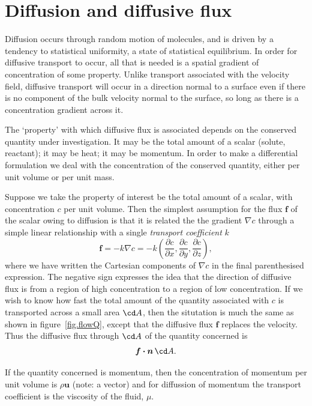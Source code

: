 \documentclass[a4paper,11pt]		{report}
\begin{document}
\section{Diffusion and diffusive flux}

Diffusion occurs through random motion of molecules, and is driven by
a tendency to statistical uniformity, \ie a state of statistical
equilibrium. In order for diffusive transport to occur, all that is
needed is a spatial gradient of concentration of some property. Unlike
transport associated with the velocity field, diffusive transport will
occur in a direction normal to a surface even if there is no component
of the bulk velocity normal to the surface, so long as there is a
concentration gradient across it.

The `property' with which diffusive flux is associated depends on the
conserved quantity under investigation. It may be the total amount of
a scalar (\eg solute, reactant); it may be heat; it may be momentum.
In order to make a differential formulation we deal with the
concentration of the conserved quantity, either per unit volume or per
unit mass.

Suppose we take the property of interest be the total amount of a
scalar, with concentration $c$ per unit volume. Then the simplest
assumption for the flux $\bm{f}$ of the scalar owing to diffusion is
that it is related the the gradient $\nabla c$ through a simple linear
relationship with a single \emph{transport coefficient} $k$
\[
\bm{f}=-k\nabla c = -k \left(
 \frac{\partial c}{\partial x},
 \frac{\partial c}{\partial y},
 \frac{\partial c}{\partial z}
\right),
\]
where we have written the Cartesian components of $\nabla c$ in the
final parenthesised expression. The negative sign expresses the idea
that the direction of diffusive flux is from a region of high
concentration to a region of low concentration. If we wish to know how
fast the total amount of the quantity associated with $c$ is
transported across a small area $\cd A$, then the situtation is much
the same as shown in figure~\ref{fig.flowQ}, except that the diffusive
flux $\bm{f}$ replaces the velocity. Thus the diffusive flux through
$\cd A$ of the quantity concerned is
\[
\bm{f\cdot n}\,\cd A.
\]

If the quantity concerned is momentum, then the concentration of
momentum per unit volume is $\rho\bm{u}$ (note: a vector) and for
diffussion of momentum the transport coefficient is the viscosity of the
fluid, $\mu$.
\end{document}
